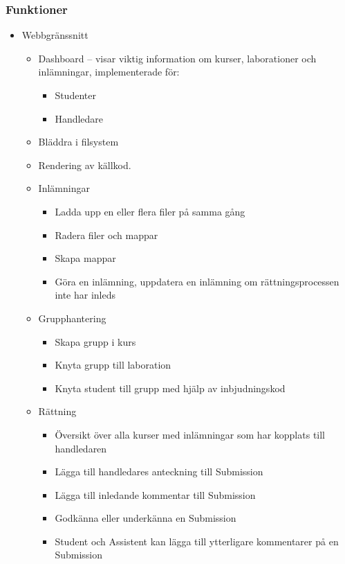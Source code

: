 \subsubsection{Funktioner}
\begin{itemize}
	\item Webbgränssnitt
	\begin{itemize}
		\item Dashboard – visar viktig information om kurser, laborationer och inlämningar, implementerade för:
		\begin{itemize}
			\item Studenter
			\item Handledare
		\end{itemize}
		\item Bläddra i filsystem
		\item Rendering av källkod.
		\item Inlämningar
		\begin{itemize}
			\item Ladda upp en eller flera filer på samma gång
			\item Radera filer och mappar
			\item Skapa mappar
			\item Göra en inlämning, uppdatera en inlämning om rättningsprocessen inte har inleds
		\end{itemize}
		\item Grupphantering
		\begin{itemize}
			\item Skapa grupp i kurs
            \item Knyta grupp till laboration
            \item Knyta student till grupp med hjälp av inbjudningskod
		\end{itemize}
		\item Rättning
		\begin{itemize}
			\item Översikt över alla kurser med inlämningar som har kopplats till handledaren
            \item Lägga till handledares anteckning till Submission
            \item Lägga till inledande kommentar till Submission
            \item Godkänna eller underkänna en Submission
            \item Student och Assistent kan lägga till ytterligare kommentarer på en Submission
		\end{itemize}
	\end{itemize}
\end{itemize}

